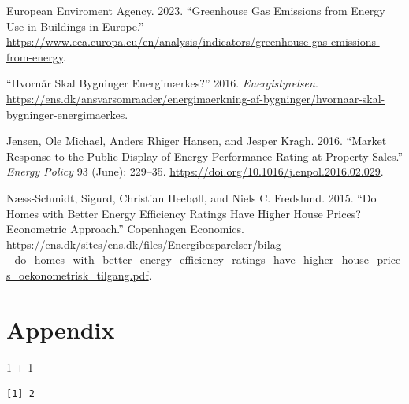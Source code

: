 \documentclass[
  letterpaper,
  DIV=11,
  numbers=noendperiod]{scrreprt}
\newenvironment{Shaded}{\begin{snugshade}}{\end{snugshade}}
\newcommand{\DecValTok}[1]{\textcolor[rgb]{0.68,0.00,0.00}{#1}}
\newcommand{\SpecialCharTok}[1]{\textcolor[rgb]{0.37,0.37,0.37}{#1}}
\newlength{\cslhangindent}
\newenvironment{CSLReferences}[2] %
 {\begin{list}{}{%
  \setlength{\itemindent}{0pt}
  \setlength{\leftmargin}{0pt}
  \setlength{\parsep}{0pt}
  \ifodd #1
   \setlength{\leftmargin}{\cslhangindent}
   \setlength{\itemindent}{-1\cslhangindent}
  \fi
  \setlength{\itemsep}{#2\baselineskip}}}
 {\end{list}}
\begin{document}
\begin{CSLReferences}{1}{0}
European Enviroment Agency. 2023. {``Greenhouse Gas Emissions from
Energy Use in Buildings in {Europe}.''}
\url{https://www.eea.europa.eu/en/analysis/indicators/greenhouse-gas-emissions-from-energy}.

{``Hvornår Skal Bygninger Energimærkes?''} 2016. \emph{Energistyrelsen}.
\url{https://ens.dk/ansvarsomraader/energimaerkning-af-bygninger/hvornaar-skal-bygninger-energimaerkes}.

Jensen, Ole Michael, Anders Rhiger Hansen, and Jesper Kragh. 2016.
{``Market Response to the Public Display of Energy Performance Rating at
Property Sales.''} \emph{Energy Policy} 93 (June): 229--35.
\url{https://doi.org/10.1016/j.enpol.2016.02.029}.

Næss-Schmidt, Sigurd, Christian Heebøll, and Niels C. Fredslund. 2015.
{``Do Homes with Better Energy Efficiency Ratings Have Higher House
Prices? {Econometric} Approach.''} Copenhagen Economics.
\url{https://ens.dk/sites/ens.dk/files/Energibesparelser/bilag_-_do_homes_with_better_energy_efficiency_ratings_have_higher_house_prices_oekonometrisk_tilgang.pdf}.

\end{CSLReferences}


\chapter{Appendix}\label{appendix}

\begin{Shaded}
\begin{Highlighting}[]
\DecValTok{1} \SpecialCharTok{+} \DecValTok{1}
\end{Highlighting}
\end{Shaded}

\begin{verbatim}
[1] 2
\end{verbatim}
\end{document}
